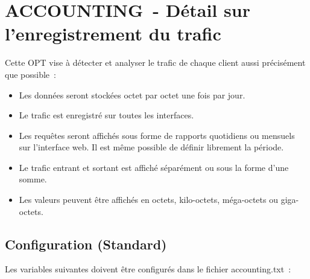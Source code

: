 {
\section {ACCOUNTING~- Détail sur l'enregistrement du trafic}
}

Cette OPT vise à détecter et analyser le trafic de chaque client aussi
précisément que possible~:
\begin{itemize}
\item Les données seront stockées octet par octet une fois par jour.
\item Le trafic est enregistré sur toutes les interfaces.
\item Les requêtes seront affichés sous forme de rapports quotidiens ou mensuels
sur l'interface web. Il est même possible de définir librement la période.
\item Le trafic entrant et sortant est affiché séparément ou sous la forme d'une somme.
\item Les valeurs peuvent être affichés en octets, kilo-octets, méga-octets ou giga-octets.
\end{itemize}

\subsection{Configuration (Standard)}
Les variables suivantes doivent être configurés dans le fichier accounting.txt~:

